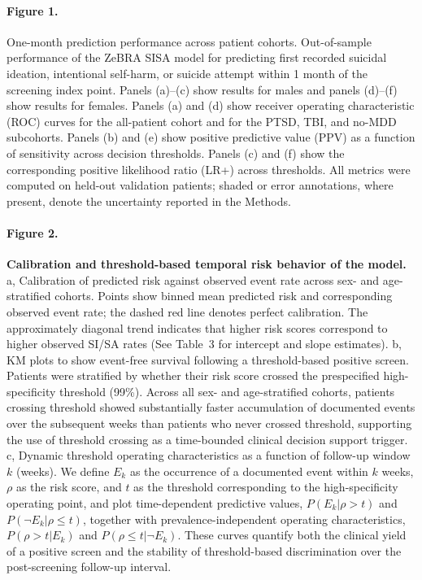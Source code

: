 \paragraph{Figure 1.} 
One-month prediction performance across patient cohorts. Out-of-sample performance of the ZeBRA SISA model for predicting first recorded suicidal ideation, intentional self-harm, or suicide attempt within 1 month of the screening index point. Panels (a)–(c) show results for males and panels (d)–(f) show results for females. Panels (a) and (d) show receiver operating characteristic (ROC) curves for the all-patient cohort and for the PTSD, TBI, and no-MDD subcohorts. Panels (b) and (e) show positive predictive value (PPV) as a function of sensitivity across decision thresholds. Panels (c) and (f) show the corresponding positive likelihood ratio (LR+) across thresholds. All metrics were computed on held-out validation patients; shaded or error annotations, where present, denote the uncertainty reported in the Methods.


\paragraph{Figure 2.} \textbf{Calibration and threshold-based temporal risk behavior of the \zebra model.}
a, Calibration of predicted risk against observed event rate across sex- and age-stratified cohorts. Points show binned mean predicted risk and corresponding observed event rate; the dashed red line denotes perfect calibration. The approximately diagonal trend indicates that higher \zebra risk scores correspond to higher observed SI/SA rates (See Table~3 for intercept and slope estimates).
b, KM plots to show event-free survival following a threshold-based positive screen. Patients were stratified by whether their \zebra risk score crossed the prespecified high-specificity threshold (99\%). Across all sex- and age-stratified cohorts, patients crossing threshold showed substantially faster accumulation of documented events over the subsequent weeks than patients who never crossed threshold, supporting the use of threshold crossing as a time-bounded clinical decision support trigger.
c, Dynamic threshold operating characteristics as a function of follow-up window $k$ (weeks). We define $E_k$ as the occurrence of a documented event within $k$ weeks, $\rho$ as the \zebra risk score, and $t$ as the threshold corresponding to the high-specificity operating point, and plot  time-dependent predictive values, $P(E_k \vert \rho > t)$ and $P(\neg E_k \vert \rho \leq t)$, together with prevalence-independent operating characteristics, $P(\rho > t \vert E_k)$ and $P(\rho \leq t \vert \neg E_k)$. These curves quantify both the clinical yield of a positive screen and the stability of threshold-based discrimination over the post-screening follow-up interval.
